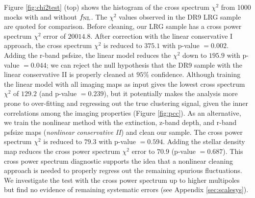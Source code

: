 Figure \ref{fig:chi2test} (top) shows the histogram of the cross spectrum $\chi^{2}$ from 1000 mocks with and without $f_{\rm NL}$. The $\chi^{2}$ values observed in the DR9 LRG sample are quoted for comparison. Before cleaning, our LRG sample has a cross power spectrum $\chi^{2}$ error of $20014.8$. After correction with the linear conservative I approach, the cross spectrum $\chi^{2}$ is reduced to $375.1$ with p-value $=0.002$. Adding the r-band psfsize, the linear model reduces the $\chi^{2}$ down to $195.9$ with p-value $=0.044$; we can reject the null hypothesis that the DR9 sample with the linear conservative II is properly cleaned at $95\%$ confidence. Although training the linear model with all imaging maps as input gives the lowest cross spectrum $\chi^{2}$ of $129.2$ (and p-value $=0.239$), but it potentially makes the analysis more prone to over-fitting and regressing out the true clustering signal, given the inner correlations among the imaging properties (Figure \ref{fig:pcc}). As an alternative, we train the nonlinear method with the extinction, z-band depth, and r-band psfsize maps (\textit{nonlinear conservative II}) and clean our sample. The cross power spectrum $\chi^{2}$ is reduced to $79.3$ with p-value $=0.594$.  Adding the stellar density map reduces the cross power spectrum $\chi^{2}$ error to $70.9$ (p-value $=0.687$). This cross power spectrum diagnostic supports the idea that a nonlinear cleaning approach is needed to properly regress out the remaining spurious fluctuations. We investigate the test with the cross power spectrum up to higher multipoles but find no evidence of remaining systematic errors (see Appendix \ref{sec:scalesys}). 

